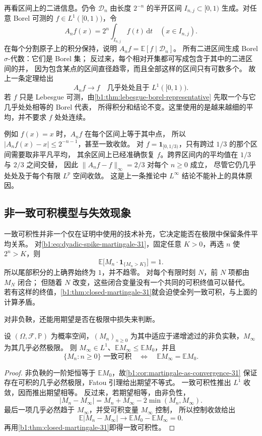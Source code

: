 再看区间上的二进信息。仍令 \(\mathcal D_n\) 由长度 \(2^{-n}\) 的半开区间
\(I_{n,j}\subset[0,1)\) 生成。对任意 Borel 可测的 \(f\in L^1([0,1))\)，令
\[
 A_nf(x)=2^n\int_{I_{n,j}}f(t)\,\mathrm dt\quad(x\in I_{n,j}).
\]
在每个分割原子上的积分保持，说明 \(A_nf=\mathbb E[f\mid\mathcal D_n]\)。
所有二进区间生成 Borel \(\sigma\)-代数：它们是 Borel 集；
反过来，每个相对开集都可写成包含于其中的二进区间的并，
因为包含某点的区间直径趋零，而且全部这样的区间只有可数多个。
故上一条定理给出
\[
 A_nf\longrightarrow f\quad\text{几乎处处且于 }L^1([0,1)).
\]
若 \(f\) 只是 Lebesgue 可测，由\cref{b1:thm:lebesgue-borel-representative}
先取一个与它几乎处处相等的 Borel 代表，
所得积分和结论不变。这里使用的是越来越细的平均，并不要求 \(f\) 处处连续。

\ProseParagraphBreak

例如 \(f(x)=x\) 时，\(A_nf\) 在每个区间上等于其中点，
所以 \(|A_nf(x)-x|\leq2^{-n-1}\)，甚至一致收敛。
对 \(f=\mathbf1_{[0,1/3)}\)，只有跨过 \(1/3\) 的那个区间需要取非平凡平均，
其余区间上已经准确恢复 \(f\)。跨界区间内的平均值在 \(1/3\) 与 \(2/3\) 之间交替，
因此 \(\|A_nf-f\|_\infty=2/3\) 对每个 \(n\geq0\) 成立，
尽管它仍几乎处处及于每个有限 \(L^p\) 空间收敛。
这是上一条推论中 \(L^\infty\) 结论不能补上的具体原因。

\subsection{非一致可积模型与失效现象}
\label{b1:subsec:310604}

一致可积性并非一个仅在证明中使用的技术补充，它决定能否在极限中保留条件平均关系。
对\eqref{b1:eq:dyadic-spike-martingale-31}，固定任意 \(K>0\)，再选 \(n\) 使 \(2^n>K\)，则
\[
 \mathbb E\bigl[M_n\cdot\mathbf1_{\{M_n>K\}}\bigr]=1.
\]
所以尾部积分的上确界始终为 \(1\)，并不趋零。
对每个有限时刻 \(N\)，前 \(N\) 项都由 \(M_N\) 闭合；
但随着 \(N\) 改变，这些闭合变量没有一个共同的可积终值可以替代。
若有这样的终值，\cref{b1:thm:closed-martingale-31}就会迫使全列一致可积，与上面的计算矛盾。

\ProseParagraphBreak

对非负鞅，还能用期望是否在极限中损失来判断。

\begin{proposition}[非负鞅的期望保持判据]
\label{b1:prop:nonnegative-martingale-ui-31}
设 \((\Omega,\mathcal F,\mathbb P)\) 为概率空间，\((M_n)_{n\geq0}\)
为其中适应于递增滤过的非负实鞅，\(M_\infty\) 为其几乎必然极限。
则 \(M_\infty\in L^1\)、\(\mathbb E M_\infty\leq\mathbb E M_0\)，并且
\[
 \{M_n:n\geq0\}\text{ 一致可积}
 \quad\Longleftrightarrow\quad
 \mathbb E M_\infty=\mathbb E M_0.
\]
\end{proposition}
\begin{proof}
非负鞅的一阶矩恒等于 \(\mathbb E M_0\)，故\cref{b1:cor:martingale-as-convergence-31}
保证存在可积的几乎必然极限，Fatou 引理给出期望不等式。
一致可积性推出 \(L^1\) 收敛，因而推出期望相等。
反过来，若期望相等，由非负性，
\[
 |M_n-M_\infty|=M_n+M_\infty-2\min(M_n,M_\infty).
\]
最后一项几乎必然趋于 \(M_\infty\)，并受可积变量 \(M_\infty\) 控制，
所以控制收敛给出
\[
 \mathbb E|M_n-M_\infty|
 \longrightarrow\mathbb E M_0-\mathbb E M_\infty=0.
\]
再用\cref{b1:thm:closed-martingale-31}即得一致可积性。
\end{proof}

